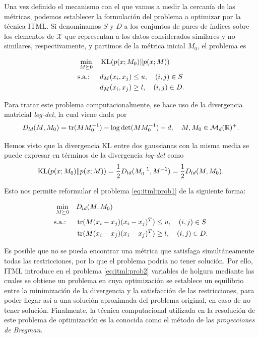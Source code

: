 Una vez definido el mecanismo con el que vamos a medir la cercanía de las métricas, podemos establecer la formulación del problema a optimizar por la técnica ITML. Si denominamos $S$ y $D$ a los conjuntos de pares de índices sobre los elementos de $\mathcal{X}$ que representan a los datos considerados similares y no similares, respectivamente, y partimos de la métrica inicial $M_0$, el problema es

\begin{equation} \label{eq:itml:prob1}
    \begin{split}
    \min_{M \succeq 0} &\quad \operatorname{KL}(p(x;M_0)\|p(x;M))  \\
    \text{s.a.: } &\quad d_M(x_i,x_j) \le u, \quad (i,j) \in S \\
                  &\quad d_M(x_i,x_j) \ge l, \quad (i,j) \in D.
    \end{split}
\end{equation}

Para tratar este problema computacionalmente, se hace uso de la divergencia matricial \emph{log-det}, la cual viene dada por
\[ D_{ld}(M,M_0) = \operatorname{tr}(MM_0^{-1}) - \log\det(MM_0^{-1}) -d, \quad M,M_0 \in \mathcal{M}_d(\mathbb{R})^+. \]

Hemos visto que la divergencia KL entre dos gaussianas con la misma media se puede expresar en términos de la divergencia \emph{log-det} como
\[ \operatorname{KL}(p(x;M_0)\|p(x;M)) = \frac{1}{2}D_{ld}(M_0^{-1},M^{-1}) = \frac{1}{2}D_{ld}(M,M_0). \]

Esto nos permite reformular el problema \ref{eq:itml:prob1} de la siguiente forma:

\begin{equation} \label{eq:itml:prob2}
    \begin{split}
    \min_{M \succeq 0} &\quad D_{ld}(M,M_0)  \\
    \text{s.a.: } &\quad \operatorname{tr}(M(x_i-x_j)(x_i-x_j)^T) \le u, \quad (i,j) \in S \\
                  &\quad \operatorname{tr}(M(x_i-x_j)(x_i-x_j)^T) \ge l, \quad (i,j) \in D.
    \end{split}
\end{equation}

Es posible que no se pueda encontrar una métrica que satisfaga simultáneamente todas las restricciones, por lo que el problema podría no tener solución. Por ello, ITML introduce en el problema \ref{eq:itml:prob2} variables de holgura mediante las cuales se obtiene un problema en cuya optimización se establece un equilibrio entre la minimización de la divergencia y la satisfacción de las restricciones, para poder llegar así a una solución aproximada del problema original, en caso de no tener solución. Finalmente, la técnica computacional utilizada en la resolución de este problema de optimización es la conocida como el método de las \emph{proyecciones de Bregman}.

